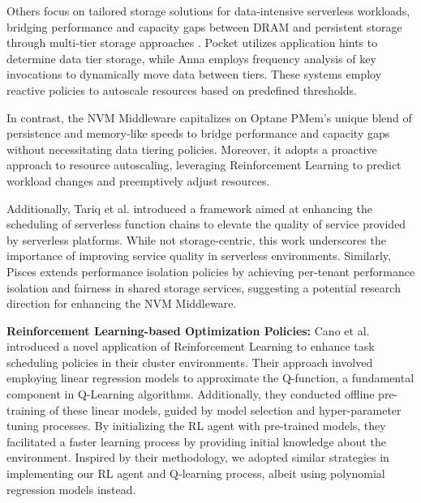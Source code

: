 Others focus on tailored storage solutions for data-intensive serverless workloads, bridging performance and capacity gaps between DRAM and persistent storage through multi-tier storage approaches \cite{klimovic2018pocket,wu2019autoscaling}. Pocket \cite{klimovic2018pocket} utilizes application hints to determine data tier storage, while Anna \cite{wu2019autoscaling} employs frequency analysis of key invocations to dynamically move data between tiers. These systems employ reactive policies to autoscale resources based on predefined thresholds.

In contrast, the NVM Middleware capitalizes on Optane PMem's unique blend of persistence and memory-like speeds to bridge performance and capacity gaps without necessitating data tiering policies. Moreover, it adopts a proactive approach to resource autoscaling, leveraging Reinforcement Learning to predict workload changes and preemptively adjust resources.

Additionally, Tariq et al. \cite{tariq2020sequoia} introduced a framework aimed at enhancing the scheduling of serverless function chains to elevate the quality of service provided by serverless platforms. While not storage-centric, this work underscores the importance of improving service quality in serverless environments. Similarly, Pisces \cite{180275} extends performance isolation policies by achieving per-tenant performance isolation and fairness in shared storage services, suggesting a potential research direction for enhancing the NVM Middleware.

\textbf{Reinforcement Learning-based Optimization Policies:} Cano et al. \cite{cano2017curator} introduced a novel application of Reinforcement Learning to enhance task scheduling policies in their cluster environments. Their approach involved employing linear regression models to approximate the Q-function, a fundamental component in Q-Learning algorithms. Additionally, they conducted offline pre-training of these linear models, guided by model selection and hyper-parameter tuning processes. By initializing the RL agent with pre-trained models, they facilitated a faster learning process by providing initial knowledge about the environment. Inspired by their methodology, we adopted similar strategies in implementing our RL agent and Q-learning process, albeit using polynomial regression models instead.


